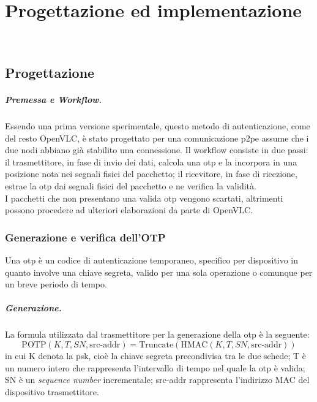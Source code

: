 \chapter{Progettazione ed implementazione}
\label{cap:progettazione}

\\

\section{Progettazione}

\paragraph{Premessa e Workflow.}
Essendo una prima versione sperimentale, questo metodo di autenticazione, come del resto OpenVLC, è stato progettato per una comunicazione \gls{p2p}\glsfirstoccur e assume che i due nodi abbiano già stabilito una connessione.
Il workflow consiste in due passi: il trasmettitore, in fase di invio dei dati, calcola una \gls{otp} e la incorpora in una posizione nota nei segnali fisici del pacchetto; il ricevitore, in fase di ricezione, estrae la \gls{otp} dai segnali fisici del pacchetto e ne verifica la validità.\\
I pacchetti che non presentano una valida \gls{otp} vengono scartati, altrimenti possono procedere ad ulteriori elaborazioni da parte di OpenVLC.


\subsection{Generazione e verifica dell'OTP}
Una \gls{otp} è un codice di autenticazione temporaneo, specifico per dispositivo in quanto involve una chiave segreta, valido per una sola operazione o comunque per un breve periodo di tempo.

\paragraph{Generazione.}
La formula utilizzata dal trasmettitore per la generazione della \gls{otp} è la seguente:
\begin{equation}
    \text{POTP}(K, T, SN, \text{src-addr}) = \text{Truncate}\left( \text{HMAC}(K, T, SN, \text{src-addr}) \right)
    \label{eq:potp}
\end{equation}
in cui K denota la \gls{psk}, cioè la chiave segreta precondivisa tra le due schede; T è un numero intero che rappresenta l'intervallo di tempo nel quale la \gls{otp} è valida; SN è un \textit{sequence number} incrementale; src-addr rappresenta l'indirizzo MAC del dispositivo trasmettitore.

